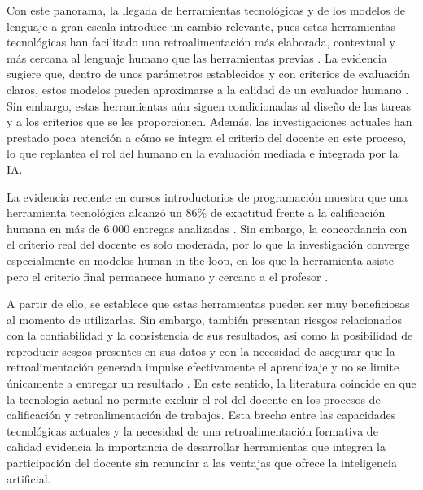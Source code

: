 \documentclass[letterpaper, 10 pt, conference]{ieeeconf}
\begin{document}
Con este panorama, la llegada de herramientas tecnológicas y de los modelos de lenguaje a gran escala introduce un cambio relevante, pues estas herramientas tecnológicas han facilitado una retroalimentación más elaborada, contextual y más cercana al lenguaje humano que las herramientas previas \cite{12}. La evidencia sugiere que, dentro de unos parámetros establecidos y con criterios de evaluación claros, estos modelos pueden aproximarse a la calidad de un evaluador humano \cite{12}. Sin embargo, estas herramientas aún siguen condicionadas al diseño de las tareas y a los criterios que se les proporcionen. Además, las investigaciones actuales han prestado poca atención a cómo se integra el criterio del docente en este proceso, lo que replantea el rol del humano en la evaluación mediada e integrada por la IA. 

La evidencia reciente en cursos introductorios de programación muestra que una herramienta tecnológica alcanzó un 86\% de exactitud frente a la calificación humana en más de 6.000 entregas analizadas \cite{23}. Sin embargo, la concordancia con el criterio real del docente es solo moderada, por lo que la investigación converge especialmente en modelos human-in-the-loop, en los que la herramienta asiste pero el criterio final permanece humano y cercano a el profesor \cite{8}\cite{21}. 

A partir de ello, se establece que estas herramientas pueden ser muy beneficiosas al momento de utilizarlas. Sin embargo, también presentan riesgos relacionados con la confiabilidad y la consistencia de sus resultados, así como la posibilidad de reproducir sesgos presentes en sus datos y con la necesidad de asegurar que la retroalimentación generada impulse efectivamente el aprendizaje y no se limite únicamente a entregar un resultado \cite{13}. En este sentido, la literatura coincide en que la tecnología actual no permite excluir el rol del docente en los procesos de calificación y retroalimentación de trabajos. Esta brecha entre las capacidades tecnológicas actuales y la necesidad de una retroalimentación formativa de calidad evidencia la importancia de desarrollar herramientas que integren la participación del docente sin renunciar a las ventajas que ofrece la inteligencia artificial.
\end{document}
